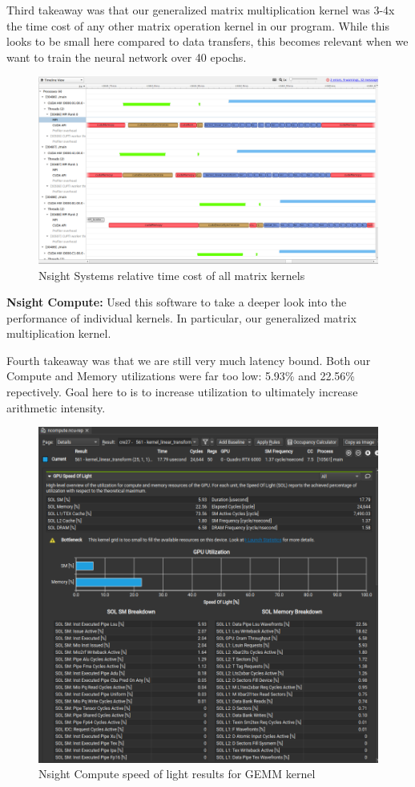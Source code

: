 \documentclass[12pt,letterpaper,twoside]{article}
\begin{document}
Third takeaway was that our generalized matrix multiplication kernel was 3-4x the time 
cost of any other matrix operation kernel in our program. While this looks to be small 
here compared to data transfers, this becomes relevant when we want to train the neural 
network over 40 epochs.

\begin{figure}[!htbp]
    \centering
    \includegraphics[scale=0.3]{nsight_systems_kernels.png}
    \caption{Nsight Systems relative time cost of all matrix kernels}
\end{figure}


\textbf{Nsight Compute:} Used this software to take a deeper look into the performance of 
individual kernels. In particular, our generalized matrix multiplication kernel.

Fourth takeaway was that we are still very much latency bound. Both our Compute and Memory
utilizations were far too low: 5.93\% and 22.56\% repectively. Goal here to is to increase 
utilization to ultimately increase arithmetic intensity. 

\begin{figure}[!htbp]
    \centering
    \includegraphics[scale=0.5]{nsight_compute_sol.png}
    \caption{Nsight Compute speed of light results for GEMM kernel}
\end{figure}
\end{document}
